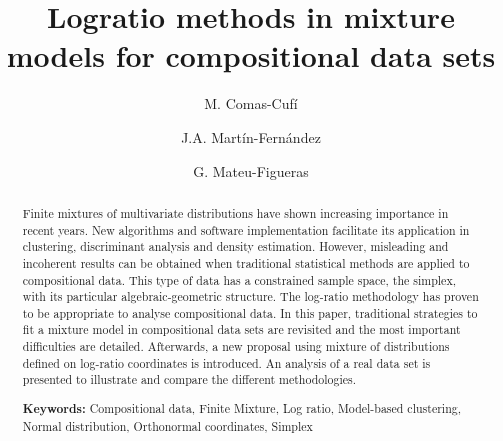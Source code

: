 \documentclass[12pt, a4paper]{article}
\title{Logratio methods in mixture models for compositional data sets}
\author{M. Comas-Cufí \and J.A. Martín-Fernández \and G. Mateu-Figueras}
\begin{document}
\maketitle




\begin{abstract}
Finite mixtures of multivariate distributions have shown increasing importance in recent years. New algorithms and software implementation facilitate its application in clustering, discriminant analysis and density estimation. 
However, misleading and incoherent results can be obtained when traditional statistical methods are applied to compositional data. This type of data has a constrained sample space, the simplex, with its particular algebraic-geometric structure. The log-ratio methodology has proven to be appropriate to analyse compositional data. In this paper, traditional strategies to fit a mixture model in compositional data sets are revisited and the most important difficulties are detailed. Afterwards, a new proposal using mixture of distributions defined on log-ratio coordinates is introduced. An analysis of a real data set is presented to illustrate and compare the different methodologies.

{\bf Keywords:} Compositional data, Finite Mixture, Log ratio, Model-based clustering, Normal distribution, Orthonormal coordinates, Simplex
\end{abstract}



\end{document}
